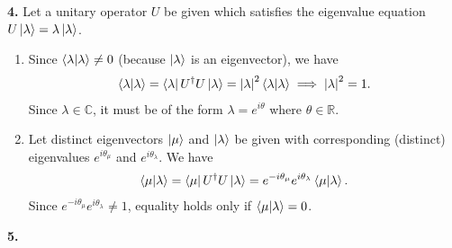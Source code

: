 \documentclass{article}
\theoremstyle{definition}
\begin{document}
\noindent \textbf{4.} Let a unitary operator $U$ be given which satisfies the eigenvalue equation $U\ket{\lambda} = \lambda\ket{\lambda}$.

\begin{enumerate}[label = (\alph*)]
	\item Since $\braket{\lambda} \neq 0$ (because $\ket{\lambda}$ is an eigenvector), we have
	\begin{align*}
	\braket{\lambda} = \bra{\lambda} U^\dagger U  \ket{\lambda } = \abs{\lambda}^2 \braket{\lambda} \implies  \abs{\lambda}^2 = 1.
	\end{align*}
	Since $\lambda\in \mathbb{C}$, it must be of the form $\lambda = e^{i\theta}$	where $\theta\in \mathbb{R}$. 
	
	
	\item Let distinct  eigenvectors $\ket{\mu}$ and $\ket{\lambda}$ be given with corresponding (distinct) eigenvalues $e^{i\theta_\mu}$ and $e^{i\theta_\lambda}$. We have
	\begin{align*}
	\bra{\mu}\ket{\lambda} = \bra{\mu} U^\dagger U \ket{\lambda} =  e^{-i\theta_\mu}e^{i\theta_\lambda}\bra{\mu}\ket{\lambda}.
	\end{align*}
	Since $e^{-i\theta_\mu}e^{i\theta_\lambda} \neq 1$, equality holds only if $\bra{\mu}\ket{\lambda} = 0$. 
\end{enumerate}



\noindent \textbf{5.} 
\end{document}
